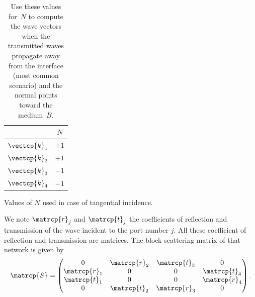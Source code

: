 \begin{table}[hbtp]
    \centering
    \begin{tabular}{cc}
        \toprule
                       & $N$  \\
        \midrule
        $\vectcp{k}_1$ & $+1$ \\
        $\vectcp{k}_2$ & $+1$ \\
        $\vectcp{k}_3$ & $-1$ \\
        $\vectcp{k}_4$ & $-1$ \\
        \bottomrule
    \end{tabular}
    \caption{
        Values of $N$ used in case of tangential incidence.
    }
    \caption*{
        Use these values for~$N$ to compute the wave vectors when
        the transmitted waves propagate away from the interface (most common scenario)
        and the normal points toward the medium~$B$.
    }
    \label{tab:fresnel_implementation_N}
\end{table}

We note $\matrcp{r}_j$ and $\matrcp{t}_j$ the coefficients of reflection and transmission of the wave incident to the port number $j$.
All these coefficient of reflection and transmission are matrices.
The block scattering matrix of that network is given by
\begin{equation}
    \matrcp{S} =
    \begin{pmatrix}
        0            & \matrcp{r}_2 & \matrcp{t}_3 & 0            \\
        \matrcp{r}_1 & 0            & 0            & \matrcp{t}_4 \\
        \matrcp{t}_1 & 0            & 0            & \matrcp{r}_4 \\
        0            & \matrcp{t}_2 & \matrcp{r}_3 & 0            \\
    \end{pmatrix}
    \text{.}
\end{equation}

